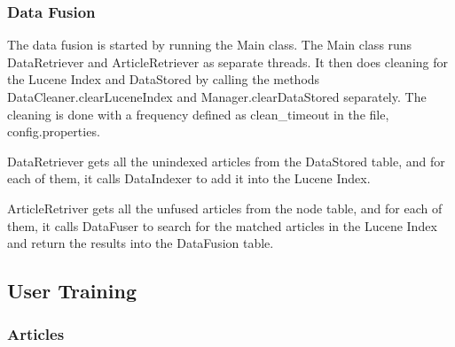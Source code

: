 \documentclass[11pt]{article} %
\begin{document}
\subsubsection{Data Fusion}

The data fusion is started by running the Main class. The Main class runs DataRetriever and ArticleRetriever as separate threads. It then does cleaning for the Lucene Index and DataStored by calling the methods DataCleaner.clearLuceneIndex and Manager.clearDataStored separately. The cleaning is done with a frequency defined as clean\_timeout in the file, config.properties.

DataRetriever gets all the unindexed articles from the DataStored table, and for each of them, it calls DataIndexer to add it into the Lucene Index.

ArticleRetriver gets all the unfused articles from the node table, and for each of them, it calls DataFuser to search for the matched articles in the Lucene Index and return the results into the DataFusion table. 

\subsection{User Training}

\subsubsection{Articles}
\end{document}
